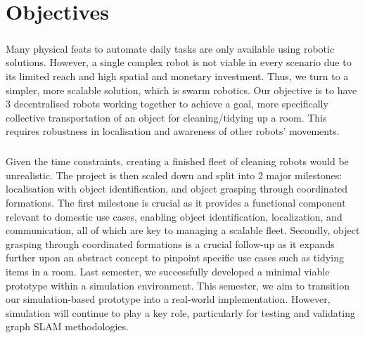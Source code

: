 \chapter{Objectives}

\paragraph*{}
Many physical feats to automate daily tasks are only available using robotic solutions. However, a single complex robot is not viable in every scenario due to its limited reach and high spatial and monetary investment. Thus, we turn to a simpler, more scalable solution, which is swarm robotics. Our objective is to have 3 decentralised robots working together to achieve a goal, more specifically collective transportation of an object for cleaning/tidying up a room. This requires robustness in localisation and awareness of other robots' movements.

\paragraph*{}
Given the time constraints, creating a finished fleet of cleaning robots would be unrealistic. The project is then scaled down and split into 2 major milestones: localisation with object identification, and object grasping through coordinated formations. The first milestone is crucial as it provides a functional component relevant to domestic use cases, enabling object identification, localization, and communication, all of which are key to managing a scalable fleet. Secondly, object grasping through coordinated formations is a crucial follow-up as it expands further upon an abstract concept to pinpoint specific use cases such as tidying items in a room. Last semester, we successfully developed a minimal viable prototype within a simulation environment. This semester, we aim to transition our simulation-based prototype into a real-world implementation. However, simulation will continue to play a key role, particularly for testing and validating graph SLAM methodologies.

